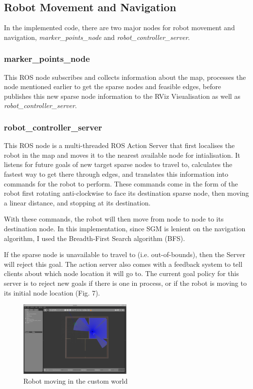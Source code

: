 \documentclass[conference]{IEEEtran}
\begin{document}
\subsection{Robot Movement and Navigation}
In the implemented code, there are two major nodes for robot movement and navigation, \textit{marker\_points\_node} and \textit{robot\_controller\_server}.

\subsubsection{marker\_points\_node}
This ROS node subscribes and collects information about the map, processes the node mentioned earlier to get the sparse nodes and feasible edges, before publishes this new sparse node information to the RViz Visualisation as well as \textit{robot\_controller\_server}.

\subsubsection{robot\_controller\_server}
This ROS node is a multi-threaded ROS Action Server that first localises the robot in the map and moves it to the nearest available node for intialisation. It listens for future goals of new target sparse nodes to travel to, calculates the fastest way to get there through edges, and translates this information into commands for the robot to perform. These commands come in the form of the robot first rotating anti-clockwise to face its destination sparse node, then moving a linear distance, and stopping at its destination.

With these commands, the robot will then move from node to node to its destination node. In this implementation, since SGM is lenient on the navigation algorithm, I used the Breadth-First Search algorithm (BFS).

If the sparse node is unavailable to travel to (i.e. out-of-bounds), then the Server will reject this goal. The action server also comes with a feedback system to tell clients about which node location it will go to. The current goal policy for this server is to reject new goals if there is one in process, or if the robot is moving to its initial node location (Fig. 7).

\begin{figure}[h]
  \centering
  \includegraphics[width=0.5\textwidth]{../assets/map_nav_2.png}
  \caption{Robot moving in the custom world}
  \label{fig:example}
\end{figure}
\end{document}
